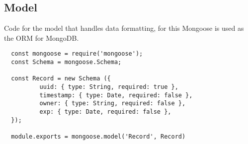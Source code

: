 \subsection{Model}
Code for the model that handles data formatting, for this Mongoose is used as the ORM for MongoDB. \label{appendix:model}
\begin{lstlisting}
  const mongoose = require('mongoose');
  const Schema = mongoose.Schema;
  
  const Record = new Schema ({
          uuid: { type: String, required: true },
          timestamp: { type: Date, required: false },
          owner: { type: String, required: false },
          exp: { type: Date, required: false },
  });
  
  module.exports = mongoose.model('Record', Record)
  
\end{lstlisting}

